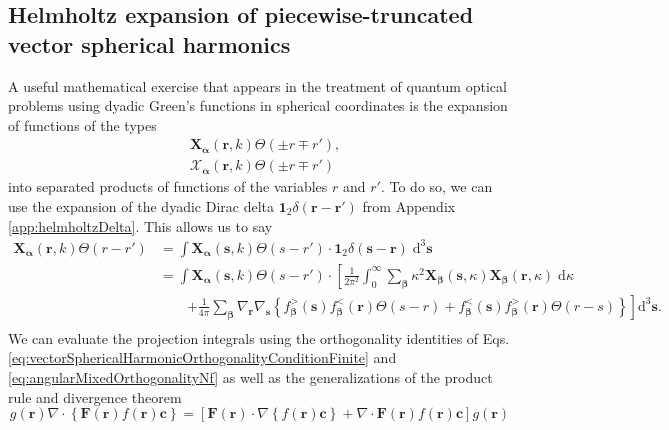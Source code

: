 \documentclass{article}
\begin{document}
\subsection{Helmholtz expansion of piecewise-truncated vector spherical harmonics}\label{sec:truncatedHarmonicExpansion}

A useful mathematical exercise that appears in the treatment of quantum optical problems using dyadic Green's functions in spherical coordinates is the expansion of functions of the types
\begin{equation}
\begin{split}
&\mathbf{X}_{\bm{\alpha}}(\mathbf{r},k)\Theta(\pm r\mp r'),\\
&\bm{\mathcal{X}}_{\bm{\alpha}}(\mathbf{r},k)\Theta(\pm r\mp r')
\end{split}
\end{equation}
into separated products of functions of the variables $r$ and $r'$. To do so, we can use the expansion of the dyadic Dirac delta $\bm{1}_2\delta(\mathbf{r} - \mathbf{r}')$ from Appendix \ref{app:helmholtzDelta}. This allows us to say
\begin{equation}\label{eq:truncatedVectorHarmonicExpansion1}
\begin{split}
\mathbf{X}_{\bm{\alpha}}(\mathbf{r},k)\Theta(r - r') &= \int\mathbf{X}_{\bm{\alpha}}(\mathbf{s},k)\Theta(s - r')\cdot\bm{1}_2\delta(\mathbf{s} - \mathbf{r})\;\mathrm{d}^3\mathbf{s}\\
&= \int\mathbf{X}_{\bm{\alpha}}(\mathbf{s},k)\Theta(s - r')\cdot\left[\frac{1}{2\pi^2}\int_0^\infty\sum_{\bm{\beta}}\kappa^2\mathbf{X}_{\bm{\beta}}(\mathbf{s},\kappa)\mathbf{X}_{\bm{\beta}}(\mathbf{r},\kappa)\;\mathrm{d}\kappa\right.\\
&\qquad\left.+ \frac{1}{4\pi}\sum_{\bm{\beta}}\nabla_\mathbf{r}\nabla_\mathbf{s}\left\{ f_{\bm{\beta}}^>(\mathbf{s})f_{\bm{\beta}}^<(\mathbf{r})\Theta(s - r) +  f_{\bm{\beta}}^<(\mathbf{s})f_{\bm{\beta}}^>(\mathbf{r})\Theta(r - s)\right\}\right]\mathrm{d}^3\mathbf{s}.\\
\end{split}
\end{equation}
We can evaluate the projection integrals using the orthogonality identities of Eqs. \eqref{eq:vectorSphericalHarmonicOrthogonalityConditionFinite} and \eqref{eq:angularMixedOrthogonalityNf} as well as the generalizations of the product rule and divergence theorem
\begin{equation}\label{eq:generalizedProductRule}
g(\mathbf{r})\nabla\cdot\left\{\mathbf{F}(\mathbf{r})f(\mathbf{r})\mathbf{c}\right\} = \left[\mathbf{F}(\mathbf{r})\cdot\nabla \left\{f(\mathbf{r})\mathbf{c}\right\} + \nabla\cdot\mathbf{F}(\mathbf{r})f(\mathbf{r})\mathbf{c}\right]g(\mathbf{r})
\end{equation}
\end{document}

